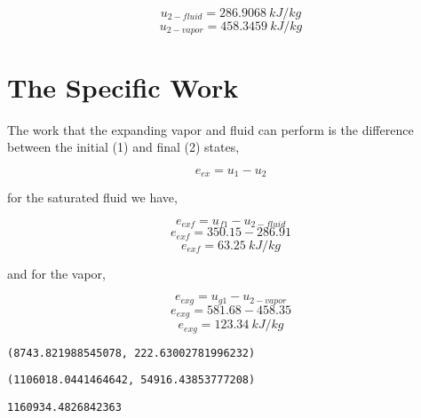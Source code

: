\documentclass[10pt,parskip=half,
toc=sectionentrywithdots,
bibliography=totocnumbered,
captions=tableheading,numbers=noendperiod]{scrartcl}
\begin{document}
\begin{equation}u_{2-fluid} = 286.9068\:kJ/kg\end{equation}
\begin{equation}u_{2-vapor} = 458.3459\:kJ/kg\end{equation}

\hypertarget{the-specific-work}{%
\section{The Specific Work}\label{the-specific-work}}

The work that the expanding vapor and fluid can perform is the
difference between the initial (1) and final (2) states,

\begin{equation}e_{ex} = u_1 - u_2\end{equation}

for the saturated fluid we have,

\begin{equation}e_{exf} = u_{f1} - u_{2-fluid}\end{equation}
\begin{equation}e_{exf} = 350.15 - 286.91\end{equation}
\begin{equation}e_{exf} = 63.25\:kJ/kg\end{equation}

and for the vapor,

\begin{equation}e_{exg} = u_{g1} - u_{2-vapor}\end{equation}
\begin{equation}e_{exg} = 581.68 - 458.35\end{equation}
\begin{equation}e_{exg} = 123.34\:kJ/kg\end{equation}

\begin{lstlisting}[language={},postbreak={},numbers=none,xrightmargin=7pt,breakindent=0pt,aboveskip=5pt,belowskip=5pt]
(8743.821988545078, 222.63002781996232)
\end{lstlisting}

\begin{lstlisting}[language={},postbreak={},numbers=none,xrightmargin=7pt,breakindent=0pt,aboveskip=5pt,belowskip=5pt]
(1106018.0441464642, 54916.43853777208)
\end{lstlisting}

\begin{lstlisting}[language={},postbreak={},numbers=none,xrightmargin=7pt,breakindent=0pt,aboveskip=5pt,belowskip=5pt]
1160934.4826842363
\end{lstlisting}
\end{document}

